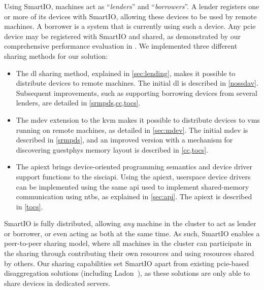 


\objdistributed*%
%
Using SmartIO, machines act as ``\emph{\glspl{lender}}'' and ``\emph{\glspl{borrower}}''. 
%
A \gls{lender} registers one or more of its devices with SmartIO, allowing these devices to be used by remote machines.
%
A \gls{borrower} is a system that is currently using such a device.
%
Any \gls{pcie} device may be registered with SmartIO and shared, as demonstrated by our comprehensive performance evaluation in .
%
We implemented three different sharing methods for our solution: 
%
\begin{itemize}
    \item The \gls{dl} sharing method, explained in \cref{sec:lending}, makes it possible to distribute devices to remote machines.
        The initial \gls{dl} is described in \cref{nossdav}. Subsequent improvements, such as supporting borrowing devices from several \glspl{lender}, are detailed in \cref{srmpds,cc,tocs}.



    \item The \gls{mdev} extension to the \gls{kvm} makes it possible to distribute devices to \glspl{vm} running on remote machines, as detailed in \cref{sec:mdev}.
        The initial \gls{mdev} is described in \cref{srmpds}, and an improved version with a mechanism for discovering \gls{guestphys} memory layout is described in \cref{cc,tocs}.



    \item The \gls{apiext} brings device-oriented programming semantics and device driver support functions to the \gls{sisciapi}.
        Using the \gls{apiext}, \gls{userspace} device drivers can be implemented using the same \gls{api} used to implement shared-memory communication using \glspl{ntb}, as explained in \cref{sec:api}.
        The \gls{apiext} is described in \cref{tocs}.
\end{itemize}
%
SmartIO is fully distributed, allowing \emph{any} machine in the cluster to act as \gls{lender} or \gls{borrower}, or even acting as both at the same time.
%
As such, SmartIO enables a peer-to-peer sharing model, where all machines in the cluster can participate in the sharing through contributing their own resources and using resources shared by others.
%
Our sharing capabilities set SmartIO apart from existing \gls{pcie}-based \gls{disaggregation} solutions (including Ladon~\cite{Tu2013}), as these solutions are only able to share devices in dedicated servers.



